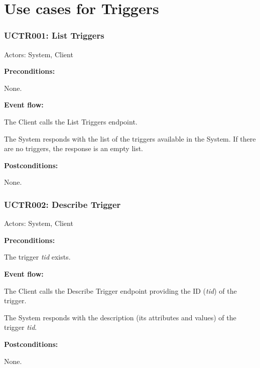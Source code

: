 \section{Use cases for Triggers}

\begin{ucbox}{\subsubsection{UCTR001: List Triggers}}
\label{UCTR001}

Actors: System, Client

\textbf{Preconditions:}

\ucitem None.

\textbf{Event flow:}

\ucitem The Client calls the List Triggers endpoint.

\ucitem The System responds with the list of the triggers available in the System. If there are no triggers, the response is an empty list.

\textbf{Postconditions:}

\ucitem None.

\end{ucbox}

\begin{ucbox}{\subsubsection{UCTR002: Describe Trigger}}
\label{UCTR002}

Actors: System, Client

\textbf{Preconditions:}

\ucitem The trigger \textit{tid} exists.

\textbf{Event flow:}

\ucitem The Client calls the Describe Trigger endpoint providing the ID (\textit{tid}) of the trigger.

\ucitem The System responds with the description (its attributes and values) of the trigger \textit{tid}.

\textbf{Postconditions:}

\ucitem None.

\end{ucbox}

